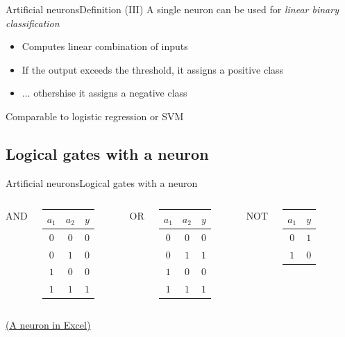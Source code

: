 \documentclass[10pt,compress]{beamer} %
\begin{document}
\begin{frame}{Artificial neurons}{Definition (III)}
	A single neuron can be used for \textit{linear binary classification}
	\begin{itemize}
	\item Computes linear combination of inputs
	\item If the output exceeds the threshold, it assigns a positive class
	\item ... othershise it assigns a negative class
	\end{itemize}

	Comparable to logistic regression or SVM
\end{frame}


\subsection{Logical gates with a neuron}
\begin{frame}{Artificial neurons}{Logical gates with a neuron}
    \begin{columns}
	   		\centering AND\\
            

			 \begin{tabular}{ccc}\hline
			 $a_1$ & $a_2$ & $y$ \\\hline
			 $0$ & $0$ & $0$ \\
			 $0$ & $1$ & $0$ \\
			 $1$ & $0$ & $0$ \\
			 $1$ & $1$ & $1$ \\
			 \end{tabular}
	   		\centering OR\\
            

			 \begin{tabular}{ccc}\hline
			 $a_1$ & $a_2$ & $y$ \\\hline
			 $0$ & $0$ & $0$ \\
			 $0$ & $1$ & $1$ \\
			 $1$ & $0$ & $0$ \\
			 $1$ & $1$ & $1$ \\
			 \end{tabular}
	   		\centering NOT\\\bigskip
            
			\vspace{1cm}
			 \begin{tabular}{cc}\hline
			 $a_1$ & $y$ \\\hline
			 $0$ & $1$ \\
			 $1$ & $0$ \\
			 \end{tabular}
    \end{columns}
	\bigskip
	\centering \href{https://github.com/dfbarrero/aiCourse/raw/master/ann/artificialNeuron.xlsx}{(A neuron in Excel)}
\end{frame}
\end{document}
